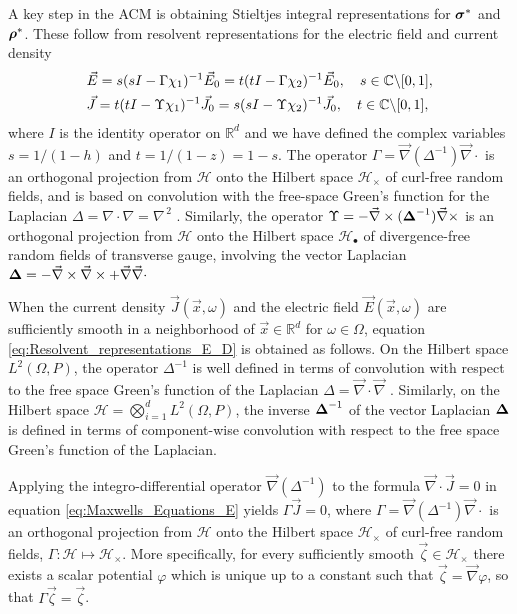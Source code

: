 \documentclass{cmslatex}
\newcommand\bsig{\mbox{\boldmath${\sigma}$}}
\newcommand\brho{\mbox{\boldmath${\rho}$}}
\newcommand\bDelta{\mbox{\boldmath${\Delta}$}}
\begin{document}
A key step in the ACM is
obtaining Stieltjes integral representations for $\bsig^*$ and
$\brho^*$. These follow from resolvent representations for the
electric field \cite{Golden:CMP-473} and current density
\cite{Murphy:JMP:063506}         
%
\begin{align}\label{eq:Resolvent_representations_E_D}
  &\vec{E}=s(sI-\Gamma\chi_1)^{-1}\vec{E}_0=t(tI-\Gamma\chi_2)^{-1}\vec{E}_0 ,
  \quad
   s\in\mathbb{C}\backslash[0,1],\\
  &\vec{J}=t(tI-\Upsilon\chi_1)^{-1}\vec{J}_0=s(sI-\Upsilon\chi_2)^{-1}\vec{J}_0 ,
  \quad
   t\in\mathbb{C}\backslash[0,1],\notag 
\end{align}
%
where $I$ is the identity operator on $\mathbb{R}^d$ and we have
defined the complex variables $s=1/(1-h)$ and $t=1/(1-z)=1-s$. The
operator $\Gamma=\vec{\nabla}(\Delta^{-1})\vec{\nabla}\cdot$ is an orthogonal projection  
from $\mathscr{H}$ onto the Hilbert space $\mathscr{H}_\times$ of curl-free 
random fields, and is based on convolution with the free-space Green's
function for the Laplacian $\Delta=\nabla\cdot\nabla=\nabla^{\,2}$ 
\cite{Golden:CMP-473,Murphy:JMP:063506}. Similarly, the operator
$\Upsilon=-\vec{\nabla}\times(\bDelta^{-1})\vec{\nabla}\times$ is an orthogonal projection from
$\mathscr{H}$ onto the Hilbert space $\mathscr{H}_\bullet$ of
divergence-free random fields of transverse gauge, involving the
vector Laplacian $\bDelta=- \vec{\nabla}\times\vec{\nabla}\times + \vec{\nabla}\vec{\nabla}\cdot $ 


When the current density $\vec{J}(\vec{x},\omega)$ and the electric
field $\vec{E}(\vec{x},\omega)$ are sufficiently smooth in a neighborhood
of $\vec{x}\in\mathbb{R}^d$ for $\omega\in\Omega$, equation
\eqref{eq:Resolvent_representations_E_D} is obtained as
follows. On the Hilbert space $L^2(\Omega,P)$, the operator $\Delta^{-1}$ is
well defined in terms of convolution with respect to the free space
Green's function of the Laplacian $\Delta=\vec{\nabla}\cdot\vec{\nabla}$
\cite{Golden:CMP-473,Folland:95}. Similarly, on the Hilbert space
$\mathscr{H}=\bigotimes_{i=1}^dL^2(\Omega,P)$, the inverse $\bDelta^{-1}$ of the
vector Laplacian $\bDelta$ is defined in terms of component-wise
convolution with respect to the free space Green's function of the
Laplacian.


Applying the integro-differential operator $\vec{\nabla}(\Delta^{-1})$ to the
formula $\vec{\nabla}\cdot\vec{J}=0$ in equation
\eqref{eq:Maxwells_Equations_E} yields $\Gamma\vec{J}=0$, where
$\Gamma=\vec{\nabla}(\Delta^{-1})\vec{\nabla}\cdot$ is an orthogonal projection
\cite{Golden:CMP-473} from $\mathscr{H}$ onto the Hilbert space
$\mathscr{H}_\times$ of curl-free random fields,
$\Gamma:\mathscr{H}\mapsto\mathscr{H}_\times$. More specifically, for every
sufficiently smooth $\vec{\zeta}\in\mathscr{H}_\times$ there exists
\cite{Jackson-1999} a scalar potential $\varphi$ which is unique up to a 
constant such that $\vec{\zeta}=\vec{\nabla}\varphi$, so that $\Gamma\vec{\zeta}=\vec{\zeta}$.
\end{document}
